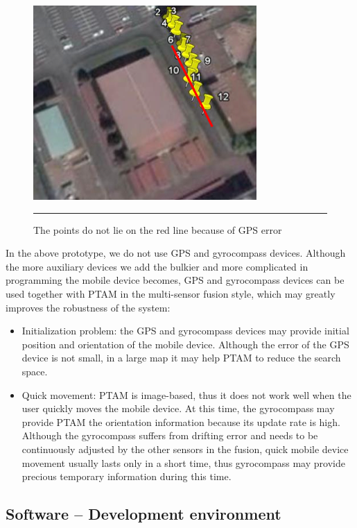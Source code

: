 \begin{figure}[htbp]
	\centering
	\includegraphics{./Primitives/gps_error.png}
	\rule{35em}{0.5pt}
	\caption[GPS error]{The points do not lie on the red line because of GPS error}
	\label{fig:GPSError}
\end{figure}

In the above prototype, we do not use GPS and gyrocompass devices. Although the more auxiliary devices we add the bulkier and more complicated in programming the mobile device becomes, GPS and gyrocompass devices can be used together with PTAM in the multi-sensor fusion \citep{Reference14} style, which may greatly improves the robustness of the system:

\begin{itemize}
	\item Initialization problem: the GPS and gyrocompass devices may provide initial position and orientation of the mobile device. Although the error of the GPS device is not small, in a large map it may help PTAM to reduce the search space.
	\item Quick movement: PTAM is image-based, thus it does not work well when the user quickly moves the mobile device. At this time, the gyrocompass may provide PTAM the orientation information because its update rate is high. Although the gyrocompass suffers from drifting error and needs to be continuously adjusted by the other sensors in the fusion, quick mobile device movement usually lasts only in a short time, thus gyrocompass may provide precious temporary information during this time.
\end{itemize}

\subsection{Software -- Development environment}

